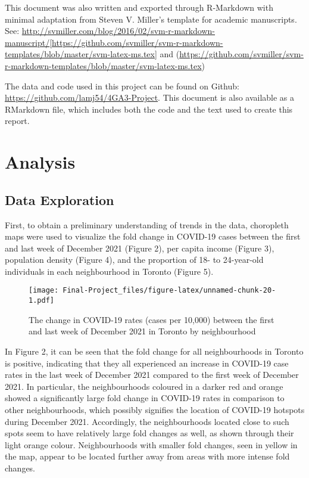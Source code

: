 \documentclass[]{article}
\begin{document}
This document was also written and exported through R-Markdown with
minimal adaptation from Steven V. Miller's template for academic
manuscripts. See:
\url{http://svmiller.com/blog/2016/02/svm-r-markdown-manuscript/}{[}\url{https://github.com/svmiller/svm-r-markdown-templates/blob/master/svm-latex-ms.tex}{]}
and
(\url{https://github.com/svmiller/svm-r-markdown-templates/blob/master/svm-latex-ms.tex})

The data and code used in this project can be found on Github:
\url{https://github.com/lamj54/4GA3-Project}. This document is also
available as a RMarkdown file, which includes both the code and the text
used to create this report.

\hypertarget{analysis}{%
\section{Analysis}\label{analysis}}

\hypertarget{data-exploration}{%
\subsection{Data Exploration}\label{data-exploration}}

First, to obtain a preliminary understanding of trends in the data,
choropleth maps were used to visualize the fold change in COVID-19 cases
between the first and last week of December 2021 (Figure 2), per capita
income (Figure 3), population density (Figure 4), and the proportion of
18- to 24-year-old individuals in each neighbourhood in Toronto (Figure
5).

\begin{figure}
\centering
\texttt{[image: Final-Project\_files/figure-latex/unnamed-chunk-20-1.pdf]}
\caption{The change in COVID-19 rates (cases per 10,000) between the
first and last week of December 2021 in Toronto by neighbourhood}
\end{figure}

In Figure 2, it can be seen that the fold change for all neighbourhoods
in Toronto is positive, indicating that they all experienced an increase
in COVID-19 case rates in the last week of December 2021 compared to the
first week of December 2021. In particular, the neighbourhoods coloured
in a darker red and orange showed a significantly large fold change in
COVID-19 rates in comparison to other neighbourhoods, which possibly
signifies the location of COVID-19 hotspots during December 2021.
Accordingly, the neighbourhoods located close to such spots seem to have
relatively large fold changes as well, as shown through their light
orange colour. Neighbourhoods with smaller fold changes, seen in yellow
in the map, appear to be located further away from areas with more
intense fold changes.
\end{document}
